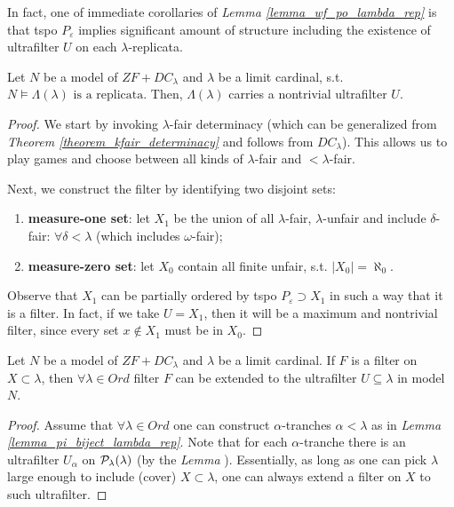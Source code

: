 In fact, one of immediate corollaries of \textit{Lemma \ref{lemma_wf_po_lambda_rep}} is that tspo $P_{\varepsilon}$ implies significant amount of structure including the existence of ultrafilter $U$ on each $\lambda$-replicata.

\begin{lemma}\label{lemma_ultrafilter_on_replicata}
    Let $N$ be a model of $ZF+DC_\lambda$ and $\lambda$ be a limit cardinal, s.t. $N \models \Lambda(\lambda) \text{ is a replicata}$. Then, $\Lambda(\lambda)$ carries a nontrivial ultrafilter $U$.
\end{lemma}
\begin{proof}
    We start by invoking $\lambda$-fair determinacy (which can be generalized from \textit{Theorem \ref{theorem_kfair_determinacy}} and follows from $DC_\lambda$). This allows us to play games and choose between all kinds of $\lambda$-fair and $<\lambda$-fair.

    Next, we construct the filter by identifying two disjoint sets:
    \begin{enumerate}[label=(\roman*)]
        \item \textbf{measure-one set}: let $X_1$ be the union of all $\lambda$-fair, $\lambda$-unfair and include $\delta$-fair: $\forall \delta < \lambda$ (which includes $\omega$-fair);
        \item \textbf{measure-zero set}: let $X_0$ contain all finite unfair, s.t. $|X_0| = \aleph_0$.
    \end{enumerate}

    Observe that $X_1$ can be partially ordered by tspo $P_{\varepsilon} \supset X_1$ in such a way that it is a filter. In fact, if we take $U = X_1$, then it will be a maximum and nontrivial filter, since every set $x \notin X_1$ must be in $X_0$.
\end{proof}

\begin{corollary}\label{corollary_ultrafilter_theorem}
    Let $N$ be a model of $ZF+DC_\lambda$ and $\lambda$ be a limit cardinal. If $F$ is a filter on $X \subset \lambda$, then $\forall \lambda \in Ord$ filter $F$ can be extended to the ultrafilter $U \subseteq \lambda$ in model $N$.
\end{corollary}
\begin{proof}
    Assume that $\forall \lambda \in Ord$ one can construct $\alpha$-tranches $\alpha < \lambda$ as in \textit{Lemma \ref{lemma_pi_biject_lambda_rep}}. Note that for each $\alpha$-tranche there is an ultrafilter $U_\alpha$ on $\mathcal{P}_\lambda(\lambda)$ (by the \textit{Lemma }). Essentially, as long as one can pick $\lambda$ large enough to include (cover) $X \subset \lambda$, one can always extend a filter on $X$ to such ultrafilter.
\end{proof}

